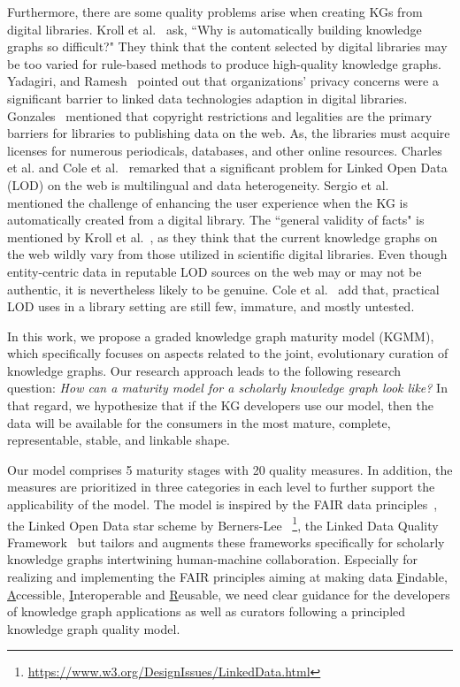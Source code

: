\documentclass[runningheads]{llncs}
\begin{document}
   Furthermore, there are some quality problems arise when creating KGs from digital libraries.
   Kroll et al.~\cite{Hermann} ask, ``Why is automatically building knowledge graphs so difficult?" They think that the content selected by digital libraries may be too varied for rule-based methods to produce high-quality knowledge graphs.
   Yadagiri, and Ramesh~\cite{Yadagiri2012SemanticWA} pointed out that organizations' privacy concerns were a significant barrier to linked data technologies adaption in digital libraries. 
   Gonzales~\cite{Gonzales2014LinkingLT} mentioned that copyright restrictions and legalities are the primary barriers for libraries to publishing data on the web. As, the libraries must acquire licenses for numerous periodicals, databases, and other online resources.
   Charles et al. \cite{charles2014links} and Cole et al.~\cite{Cole} remarked that a significant problem for Linked Open Data (LOD) on the web is multilingual and data heterogeneity.
   Sergio et al.~\cite{Oramas2014AutomaticCO} mentioned the challenge of enhancing the user experience when the KG is automatically created from a digital library.
   The ``general validity of facts" is mentioned by Kroll et al.~\cite{Kroll}, as they think that the current knowledge graphs on the web wildly vary from those utilized in scientific digital libraries. Even though entity-centric data in reputable LOD sources on the web may or may not be authentic, it is nevertheless likely to be genuine.
   Cole et al.~\cite{Cole} add that, practical LOD uses in a library setting are still few, immature, and mostly untested.

In this work, we propose a graded knowledge graph maturity model (KGMM), which specifically focuses on aspects related to the joint, evolutionary curation of knowledge graphs.
Our research approach leads to the following research question:
\textit{How can a maturity model for a scholarly knowledge graph look like?}
In that regard, we hypothesize that if the KG developers use our model, then the data will be available for the consumers in the most mature, complete, representable, stable, and linkable shape.

Our model comprises 5 maturity stages with 20 quality measures.
In addition, the measures are prioritized in three categories in each level to further support the applicability of the model.
The model is inspired by the FAIR data principles~\cite{Wilkinson2016}, the Linked Open Data star scheme by Berners-Lee ~\footnote[1]{\url{https://www.w3.org/DesignIssues/LinkedData.html}}, the Linked Data Quality Framework~\cite{zaveri2016quality} but tailors and augments these frameworks specifically for scholarly knowledge graphs intertwining human-machine collaboration. %
Especially for realizing and implementing the FAIR principles aiming at making data \underline{F}indable, \underline{A}ccessible, \underline{I}nteroperable and \underline{R}eusable, we need clear guidance for the developers of knowledge graph applications as well as curators following a principled knowledge graph quality model.
\end{document}
